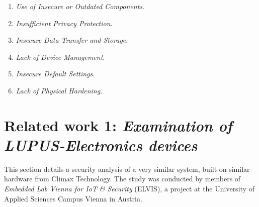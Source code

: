 \begin{enumerate}
    \item \textit{Use of Insecure or Outdated Components}.
    
    \item \textit{Insufficient Privacy Protection}.
    
    \item \textit{Insecure Data Transfer and Storage}.
    
    \item \textit{Lack of Device Management}.
    
    \item \textit{Insecure Default Settings}.
    
    \item \textit{Lack of Physical Hardening}.
\end{enumerate}

\section{Related work 1: \textit{Examination of LUPUS-Electronics devices}} \label{ch:related-work:lupus}
This section details a security analysis of a very similar system, built on similar hardware from Climax Technology. The study was conducted by members of \textit{Embedded Lab Vienna for IoT \& Security} (ELVIS), a project at the University of Applied Sciences Campus Vienna in Austria.

